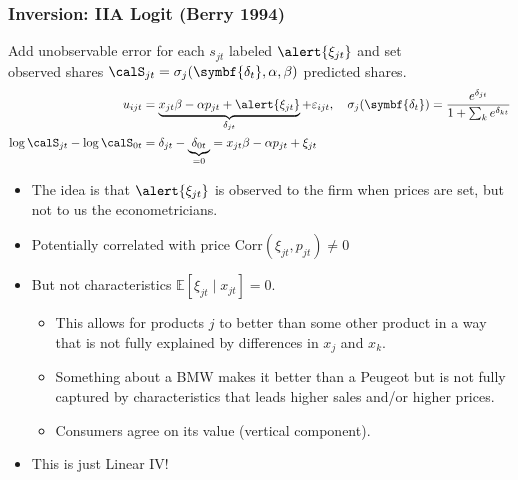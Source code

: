 \begin{frame}
\frametitle{Inversion: IIA Logit (Berry 1994)}
Add unobservable error for each $s_{jt}$ labeled $\alert{\xi_{jt}}$ and set\\
 \alert{observed shares} $\calS_{jt} = \sigma_{j}(\symbf{\delta_{t}},\alpha,\beta)$ \alert{predicted shares}.
\begin{align*}
u_{ijt} &= \underbrace{x_{jt} \beta -\alpha p_{jt} + \alert{\xi_{jt}}}_{\delta_{jt}} +  \varepsilon_{ijt} , \quad 
\sigma_j(\symbf{\delta_{t}}) = \frac{e^{\delta_{jt}} }{1+\sum_k e^{\delta_{kt}} } \\
 \log \calS_{jt} - \log \calS_{0t} &= \delta_{jt} - \underbrace{\delta_{0t}}_{=0} 
 = x_{jt} \beta -\alpha p_{jt} + \xi_{jt}
\end{align*}
\vspace{-0.5cm}
\begin{itemize}
\item The idea is that $\alert{\xi_{jt}}$ is observed to the firm when prices are set, but not to us the econometricians.
\item Potentially correlated with price $\text{Corr}(\xi_{jt},p_{jt}) \neq 0$
\item But not characteristics $\mathbb{E}[\xi_{jt} \mid  x_{jt}]=0$.
\begin{itemize}
\item This allows for products $j$ to better than some other product in a way that is not fully explained by differences in $x_j$ and $x_k$.
\item Something about a BMW makes it better than a Peugeot but is not fully captured by characteristics that leads higher sales and/or higher prices.
\item Consumers agree on its value  (\alert{vertical component}).
\end{itemize}
\item This is just Linear IV!
\end{itemize}
\end{frame}


